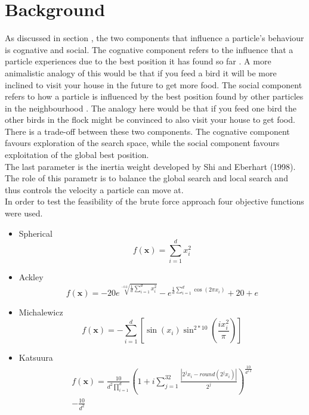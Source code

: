 \documentclass[hidelinks,english,conference]{IEEEtran}
\begin{document}
\section{Background}
As discussed in section \cite{intoductionSection}, the two components that influence a particle's behaviour is cognative and social. The cognative component refers to the influence that a particle experiences due to the best position it has found so far \cite{shi1998modified}. A more animalistic analogy of this would be that if you feed a bird it will be more inclined to visit your house in the future to get more food. The social component refers to how a particle is influenced by the best position found by other particles in the neighbourhood \cite{shi1998modified}. The analogy here would be that if you feed one bird the other birds in the flock might be convinced to also visit your house to get food. There is a trade-off between these two components. The cognative component favours exploration of the search space, while the social component favours exploitation of the global best position.\\
The last parameter is the inertia weight developed by Shi and Eberhart (1998). The role of this parametr is to balance the global search and local search \cite{shi1998modified} and thus controls the velocity a particle can move at.\\
In order to test the feasibility of the brute force approach four objective functions were used. 
\begin{itemize}
	\item Spherical
		\begin{equation}
			f(\textbf{x})=\sum_{i=1}^{d}x_{i}^{2}
		\end{equation}
	\item Ackley\\ 
		\begin{equation}
			f(\textbf{x})=-20e^{\sqrt[-0.2]{\frac{1}{d}\sum_{i=1}^{d}x_{i}^{2}}}-e^{\frac{1}{d}\sum_{i=1}^{d}\cos(2\pi x_{i})}+20+e
		\end{equation}
	\item Michalewicz\\
		\begin{equation}
			f(\textbf{x})=-\sum_{i=1}^{d}[\sin(x_i)\sin^{2*10}(\frac{ix_{i}^{2}}{\pi})]
		\end{equation}
	\item Katsuura\\
		\begin{equation}
			\begin{split}
			f(\textbf{x})=\frac{10}{d^{2}\prod_{i=1}^{d}}(1+i\sum_{j=1}^{32}\frac{\left|2^{j}x_{i}-round(2^{j}x_{i})\right|}{2^{j}})^{\frac{10}{d^{1.2}}}\\-\frac{10}{d^{2}}
			\end{split}
		\end{equation}
\end{itemize}
\end{document}
